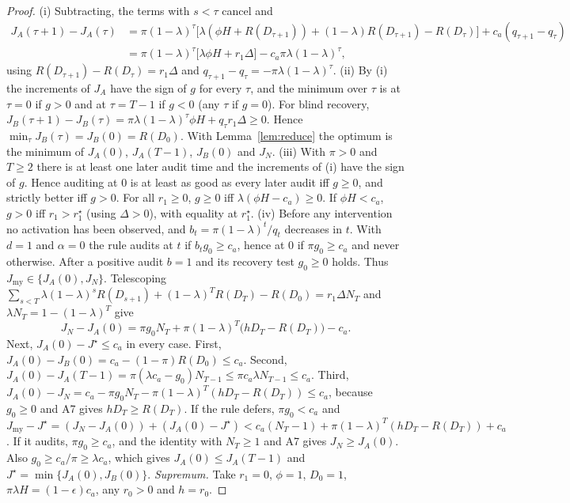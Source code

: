 \documentclass[11pt]{article}
\theoremstyle{definition}
\begin{document}
\begin{proof}
(i) Subtracting, the terms with $s<\tau$ cancel and
\begin{align*}
J_A(\tau+1)-J_A(\tau)&=\pi(1-\lambda)^\tau\big[\lambda(\phi H+R(D_{\tau+1}))+(1-\lambda)R(D_{\tau+1})-R(D_\tau)\big]+c_a(q_{\tau+1}-q_\tau)\\
&=\pi(1-\lambda)^\tau\big[\lambda\phi H+r_1\Delta\big]-c_a\pi\lambda(1-\lambda)^\tau,
\end{align*}
using $R(D_{\tau+1})-R(D_\tau)=r_1\Delta$ and $q_{\tau+1}-q_\tau=-\pi\lambda(1-\lambda)^\tau$.
(ii) By (i) the increments of $J_A$ have the sign of $g$ for every $\tau$, and the minimum over $\tau$ is at
$\tau=0$ if $g>0$ and at $\tau=T-1$ if $g<0$ (any $\tau$ if $g=0$). For blind recovery,
$J_B(\tau+1)-J_B(\tau)=\pi\lambda(1-\lambda)^\tau\phi H+q_\tau r_1\Delta\ge0$. Hence
$\min_\tau J_B(\tau)=J_B(0)=R(D_0)$. With Lemma~\ref{lem:reduce} the optimum is the minimum of $J_A(0)$,
$J_A(T-1)$, $J_B(0)$ and $J_N$.
(iii) With $\pi>0$ and $T\ge2$ there is at least one later audit time and the increments of (i) have the
sign of $g$. Hence auditing at $0$ is at least as good as every later audit iff $g\ge0$, and strictly better
iff $g>0$. For all $r_1\ge0$, $g\ge0$ iff $\lambda(\phi H-c_a)\ge0$. If $\phi H<c_a$, $g>0$ iff
$r_1>r_1^\star$ (using $\Delta>0$), with equality at $r_1^\star$.
(iv) Before any intervention no activation has been observed, and $b_t=\pi(1-\lambda)^t/q_t$ decreases in
$t$. With $d=1$ and $\alpha=0$ the rule audits at $t$ if $b_tg_0\ge c_a$, hence at $0$ if $\pi g_0\ge c_a$ and
never otherwise. After a positive audit $b=1$ and its recovery test $g_0\ge0$ holds. Thus
$J_{\mathrm{my}}\in\{J_A(0),J_N\}$. Telescoping
$\sum_{s<T}\lambda(1-\lambda)^sR(D_{s+1})+(1-\lambda)^TR(D_T)-R(D_0)=r_1\Delta N_T$ and
$\lambda N_T=1-(1-\lambda)^T$ give
\[J_N-J_A(0)=\pi g_0N_T+\pi(1-\lambda)^T\big(hD_T-R(D_T)\big)-c_a .\]
Next, $J_A(0)-J^\star\le c_a$ in every case. First, $J_A(0)-J_B(0)=c_a-(1-\pi)R(D_0)\le c_a$. Second,
$J_A(0)-J_A(T-1)=\pi(\lambda c_a-g_0)N_{T-1}\le\pi c_a\lambda N_{T-1}\le c_a$. Third, $J_A(0)-J_N=c_a-\pi g_0N_T-\pi(1-\lambda)^T(hD_T-R(D_T))\le c_a$, because $g_0\ge0$ and A7 gives
$hD_T\ge R(D_T)$. If the rule defers, $\pi g_0<c_a$ and
$J_{\mathrm{my}}-J^\star=(J_N-J_A(0))+(J_A(0)-J^\star)<c_a(N_T-1)+\pi(1-\lambda)^T(hD_T-R(D_T))+c_a$. If it
audits, $\pi g_0\ge c_a$, and the identity with $N_T\ge1$ and A7 gives $J_N\ge J_A(0)$. Also
$g_0\ge c_a/\pi\ge\lambda c_a$, which gives $J_A(0)\le J_A(T-1)$ and $J^\star=\min\{J_A(0),J_B(0)\}$.
\emph{Supremum.} Take $r_1=0$, $\phi=1$, $D_0=1$, $\pi\lambda H=(1-\epsilon)c_a$, any $r_0>0$ and $h=r_0$.

\end{proof}
\end{document}
